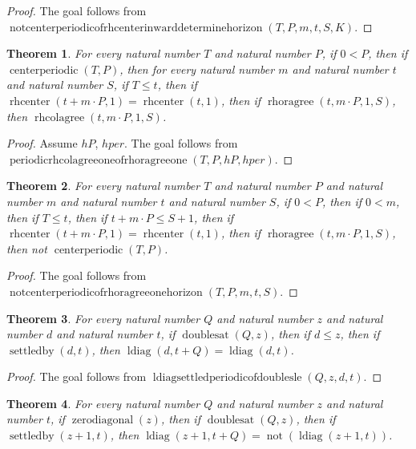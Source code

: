 \documentclass[11pt]{article}
\newtheorem{theorem}{Theorem}[section]
\theoremstyle{definition}
\begin{document}
\begin{proof}
The goal follows from \(\operatorname{notcenterperiodicofrhcenterinwarddeterminehorizon}(T, P, m, t, S, K)\).
\end{proof}
\begin{theorem}
\label{ll:paper:periodic-rhcolagree-one-of-rhoragree-one}
For every natural number \(T\) and natural number \(P\), if \(0 < P\), then if \(\operatorname{centerperiodic}(T, P)\), then for every natural number \(m\) and natural number \(t\) and natural number \(S\), if \(T \le t\), then if \(\operatorname{rhcenter}(t + m \cdot P, 1) = \operatorname{rhcenter}(t, 1)\), then if \(\operatorname{rhoragree}(t, m \cdot P, 1, S)\), then \(\operatorname{rhcolagree}(t, m \cdot P, 1, S)\).
\end{theorem}
\begin{proof}
Assume \(hP\), \(hper\).
The goal follows from \(\operatorname{periodicrhcolagreeoneofrhoragreeone}(T, P, hP, hper)\).
\end{proof}
\begin{theorem}
\label{ll:paper:not-centerperiodic-of-rhoragree-one-horizon}
For every natural number \(T\) and natural number \(P\) and natural number \(m\) and natural number \(t\) and natural number \(S\), if \(0 < P\), then if \(0 < m\), then if \(T \le t\), then if \(t + m \cdot P \le S + 1\), then if \(\operatorname{rhcenter}(t + m \cdot P, 1) = \operatorname{rhcenter}(t, 1)\), then if \(\operatorname{rhoragree}(t, m \cdot P, 1, S)\), then not \(\operatorname{centerperiodic}(T, P)\).
\end{theorem}
\begin{proof}
The goal follows from \(\operatorname{notcenterperiodicofrhoragreeonehorizon}(T, P, m, t, S)\).
\end{proof}
\begin{theorem}
\label{ll:paper:ldiag-settled-periodic-of-doubles-le}
For every natural number \(Q\) and natural number \(z\) and natural number \(d\) and natural number \(t\), if \(\operatorname{doublesat}(Q, z)\), then if \(d \le z\), then if \(\operatorname{settledby}(d, t)\), then \(\operatorname{ldiag}(d, t + Q) = \operatorname{ldiag}(d, t)\).
\end{theorem}
\begin{proof}
The goal follows from \(\operatorname{ldiagsettledperiodicofdoublesle}(Q, z, d, t)\).
\end{proof}
\begin{theorem}
\label{ll:paper:ldiag-settled-antiperiodic-of-doubles}
For every natural number \(Q\) and natural number \(z\) and natural number \(t\), if \(\operatorname{zerodiagonal}(z)\), then if \(\operatorname{doublesat}(Q, z)\), then if \(\operatorname{settledby}(z + 1, t)\), then \(\operatorname{ldiag}(z + 1, t + Q) = \operatorname{not}(\operatorname{ldiag}(z + 1, t))\).
\end{theorem}
\end{document}
